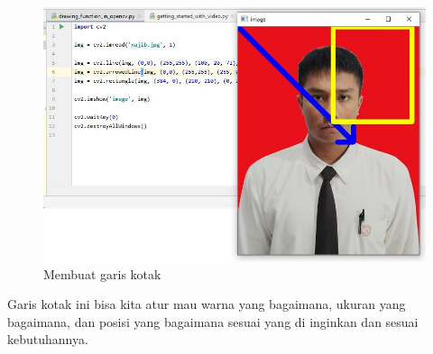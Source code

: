 \newpage
\begin{figure}[ht]
\centering
\includegraphics[scale=0.55]{figures/2,11.jpg}
\caption{Membuat garis kotak}
\label{contoh}
\end{figure}

Garis kotak ini bisa kita atur mau warna yang bagaimana, ukuran yang bagaimana, dan posisi yang bagaimana sesuai yang di inginkan dan sesuai kebutuhannya.

\newpage
